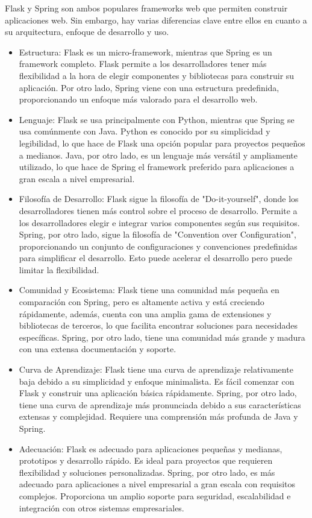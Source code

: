 Flask y Spring son ambos populares frameworks web que permiten construir aplicaciones web. Sin embargo, hay varias diferencias clave entre ellos en cuanto a su arquitectura, enfoque de desarrollo y uso.
\begin{itemize}
	\item Estructura: Flask es un micro-framework, mientras que Spring es un framework completo. Flask permite a los desarrolladores tener más flexibilidad a la hora de elegir componentes y bibliotecas para construir su aplicación. Por otro lado, Spring viene con una estructura predefinida, proporcionando un enfoque más valorado para el desarrollo web.
	\item Lenguaje: Flask se usa principalmente con Python, mientras que Spring se usa comúnmente con Java. Python es conocido por su simplicidad y legibilidad, lo que hace de Flask una opción popular para proyectos pequeños a medianos. Java, por otro lado, es un lenguaje más versátil y ampliamente utilizado, lo que hace de Spring el framework preferido para aplicaciones a gran escala a nivel empresarial.
	\item Filosofía de Desarrollo: Flask sigue la filosofía de "Do-it-yourself", donde los desarrolladores tienen más control sobre el proceso de desarrollo. Permite a los desarrolladores elegir e integrar varios componentes según sus requisitos. Spring, por otro lado, sigue la filosofía de "Convention over Configuration", proporcionando un conjunto de configuraciones y convenciones predefinidas para simplificar el desarrollo. Esto puede acelerar el desarrollo pero puede limitar la flexibilidad.
	\item Comunidad y Ecosistema: Flask tiene una comunidad más pequeña en comparación con Spring, pero es altamente activa y está creciendo rápidamente, además, cuenta con una amplia gama de extensiones y bibliotecas de terceros, lo que facilita encontrar soluciones para necesidades específicas. Spring, por otro lado, tiene una comunidad más grande y madura con una extensa documentación y soporte.
	\item Curva de Aprendizaje: Flask tiene una curva de aprendizaje relativamente baja debido a su simplicidad y enfoque minimalista. Es fácil comenzar con Flask y construir una aplicación básica rápidamente. Spring, por otro lado, tiene una curva de aprendizaje más pronunciada debido a sus características extensas y complejidad. Requiere una comprensión más profunda de Java y Spring.
	\item Adecuación: Flask es adecuado para aplicaciones pequeñas y medianas, prototipos y desarrollo rápido. Es ideal para proyectos que requieren flexibilidad y soluciones personalizadas. Spring, por otro lado, es más adecuado para aplicaciones a nivel empresarial a gran escala con requisitos complejos. Proporciona un amplio soporte para seguridad, escalabilidad e integración con otros sistemas empresariales.
\end{itemize}

